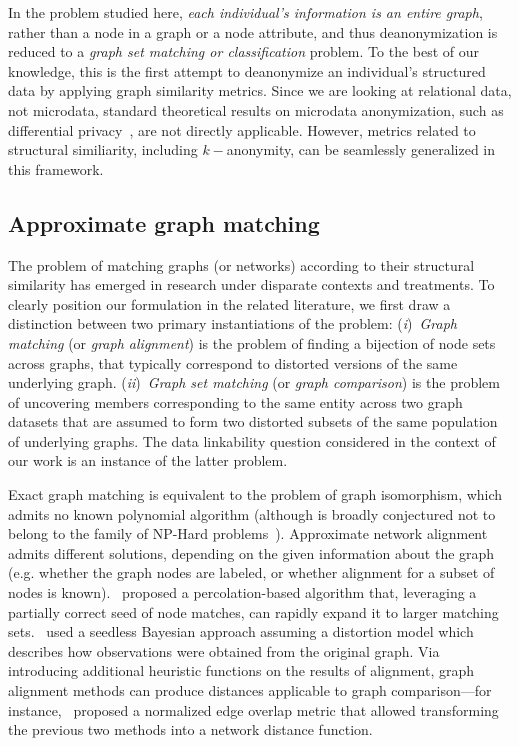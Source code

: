 In the problem studied here, \emph{each individual's information is an entire graph}, rather than a node in a graph or a node attribute, and thus deanonymization is reduced to a \emph{graph set matching or classification} problem.
To the best of our knowledge, this is the first attempt to deanonymize an individual's structured data by applying graph similarity metrics.
Since we are looking at relational data, not microdata, standard theoretical results on microdata anonymization, such as differential privacy~\citep{dwork2006calibrating}, are not directly applicable.
However, metrics related to structural similiarity, including $k-$anonymity, can be seamlessly generalized in this framework.

\subsection{Approximate graph matching}
The problem of matching graphs (or networks) according to their structural similarity has emerged in research under disparate contexts and treatments. To clearly position our formulation in the related literature, we first draw a distinction between two primary instantiations of the problem: (\emph{i})~\emph{Graph matching} (or \emph{graph alignment}) is the problem of finding a bijection of node sets across graphs, that typically correspond to distorted versions of the same underlying graph. (\emph{ii})~\emph{Graph set matching} (or \emph{graph comparison}) is the problem of uncovering members corresponding to the same entity across two graph datasets that are assumed to form two distorted subsets of the same population of underlying graphs. The data linkability question considered in the context of our work is an instance of the latter problem.

Exact graph matching is equivalent to the problem of graph isomorphism, which admits no known polynomial algorithm (although is broadly conjectured not to belong to the family of NP-Hard problems~\citep{schoening88}). Approximate network alignment admits different solutions, depending on the given information about the graph (e.g. whether the graph nodes are labeled, or whether alignment for a subset of nodes is known).~ proposed a percolation-based algorithm that, leveraging a partially correct seed of node matches, can rapidly expand it to larger matching sets.~ used a seedless Bayesian approach assuming a distortion model which describes how observations were obtained from the original graph. Via introducing additional heuristic functions on the results of alignment, graph alignment methods can produce distances applicable to graph comparison---for instance,~ proposed a normalized edge overlap metric that allowed transforming the previous two methods into a network distance function.

